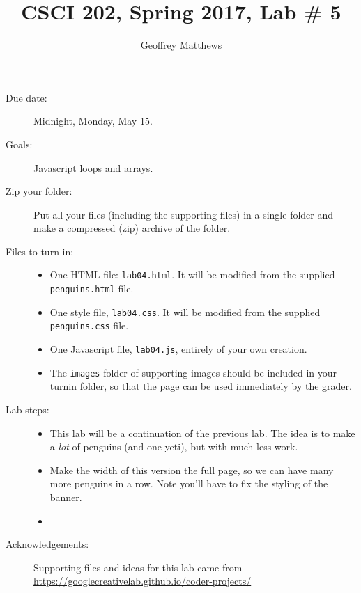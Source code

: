 \documentclass{article}
\title{CSCI 202, Spring 2017, Lab \# 5}
\author{Geoffrey Matthews}
\begin{document}
\maketitle

\begin{description}

\item[Due date:] Midnight, Monday, May 15.

\item[Goals:] Javascript loops and arrays.

\item[Zip your folder:]
  Put all your files (including the supporting files) in a single
  folder and  make a compressed (zip) archive of the folder.

\item[Files to turn in:]\mbox{}
  \begin{itemize}
  \item
    One  {HTML} file: {\tt lab04.html}.
    It will be modified from the supplied {\tt penguins.html} file.
  \item
    One  style file, {\tt lab04.css}.  It
    will be modified from the supplied {\tt penguins.css} file.
\item One  Javascript file, {\tt lab04.js}, entirely of your own
  creation. 
\item The {\tt images} folder of supporting images should be included
  in your turnin folder, so that the page can be used immediately by
  the grader.
  \end{itemize}

\item[Lab steps:]\mbox{}
  \begin{itemize}
  \item This lab will be a continuation of the previous lab.  The idea
    is to make a {\em lot} of penguins (and one yeti), but with much
    less work.
  \item Make the width of this version the full page, so we can have 
many more    penguins in a row.  Note you'll have to fix the styling
of the banner.
\item 


  \end{itemize}
  


\item[Acknowledgements:] Supporting files and ideas for this lab came
  from\\ \url{https://googlecreativelab.github.io/coder-projects/}


\end{description}
\end{document}
